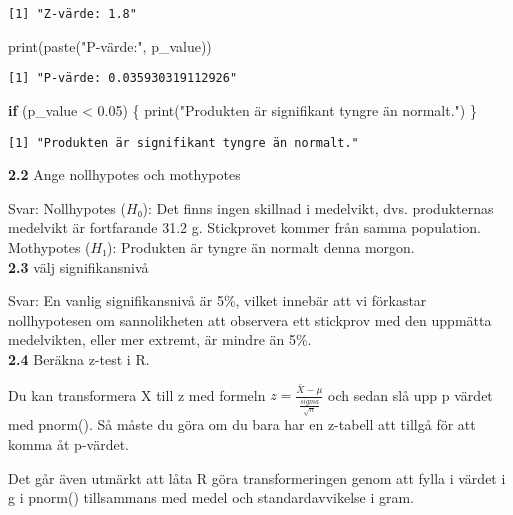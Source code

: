 \documentclass[
  letterpaper,
  DIV=11,
  numbers=noendperiod]{scrartcl}
\newenvironment{Shaded}{\begin{snugshade}}{\end{snugshade}}
\newcommand{\ControlFlowTok}[1]{\textcolor[rgb]{0.00,0.23,0.31}{\textbf{#1}}}
\newcommand{\FloatTok}[1]{\textcolor[rgb]{0.68,0.00,0.00}{#1}}
\newcommand{\FunctionTok}[1]{\textcolor[rgb]{0.28,0.35,0.67}{#1}}
\newcommand{\NormalTok}[1]{\textcolor[rgb]{0.00,0.23,0.31}{#1}}
\newcommand{\SpecialCharTok}[1]{\textcolor[rgb]{0.37,0.37,0.37}{#1}}
\newcommand{\StringTok}[1]{\textcolor[rgb]{0.13,0.47,0.30}{#1}}
\begin{document}
\begin{verbatim}
[1] "Z-värde: 1.8"
\end{verbatim}

\begin{Shaded}
\begin{Highlighting}[]
\FunctionTok{print}\NormalTok{(}\FunctionTok{paste}\NormalTok{(}\StringTok{"P{-}värde:"}\NormalTok{, p\_value))}
\end{Highlighting}
\end{Shaded}

\begin{verbatim}
[1] "P-värde: 0.035930319112926"
\end{verbatim}

\begin{Shaded}
\begin{Highlighting}[]
\ControlFlowTok{if}\NormalTok{ (p\_value }\SpecialCharTok{\textless{}} \FloatTok{0.05}\NormalTok{) \{}
  \FunctionTok{print}\NormalTok{(}\StringTok{"Produkten är signifikant tyngre än normalt."}\NormalTok{)}
\NormalTok{\}}
\end{Highlighting}
\end{Shaded}

\begin{verbatim}
[1] "Produkten är signifikant tyngre än normalt."
\end{verbatim}

\textbf{2.2} Ange nollhypotes och mothypotes

\hfill\break
Svar: Nollhypotes (\(H₀\)): Det finns ingen skillnad i medelvikt, dvs.
produkternas medelvikt är fortfarande 31.2 g. Stickprovet kommer från
samma population. Mothypotes (\(H₁\)): Produkten är tyngre än normalt
denna morgon.\\

\textbf{2.3} välj signifikansnivå

\hfill\break
Svar: En vanlig signifikansnivå är 5\%, vilket innebär att vi förkastar
nollhypotesen om sannolikheten att observera ett stickprov med den
uppmätta medelvikten, eller mer extremt, är mindre än 5\%.\\

\textbf{2.4} Beräkna z-test i R.

Du kan transformera X till z med formeln
\(z = \frac{\bar{X} - \mu}{\frac{sigma}{\sqrt{n}}}\) och sedan slå upp p
värdet med pnorm(). Så måste du göra om du bara har en z-tabell att
tillgå för att komma åt p-värdet.

Det går även utmärkt att låta R göra transformeringen genom att fylla i
värdet i g i pnorm() tillsammans med medel och standardavvikelse i gram.
\end{document}

